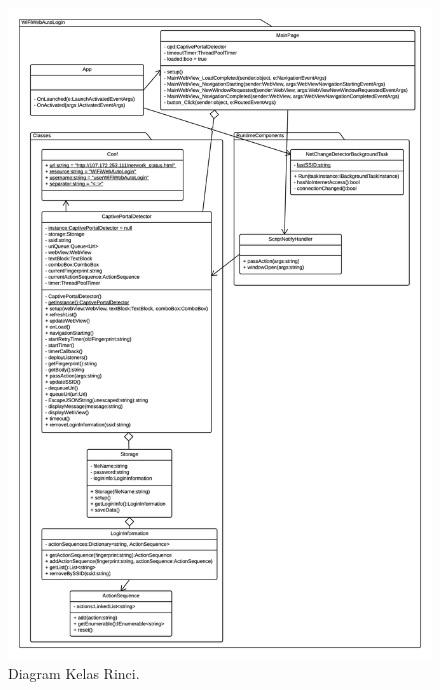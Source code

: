 \documentclass[a4paper,twoside]{article}
\begin{document}
\begin{enumerate}
\begin{itemize}
{                \begin{figure}[!htb]
                    \centering
                    \includegraphics[scale=0.63]{DetailedClassDiagram.png}
                    \caption[Diagram Kelas Rinci.]{Diagram Kelas Rinci.} 
                    \label{fig:DetailedClassDiagram}
                \end{figure}
                
}
\end{itemize}
\end{enumerate}
\end{document}

